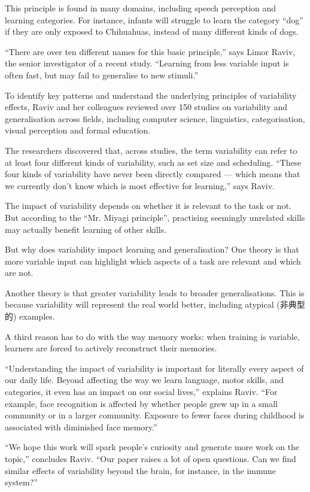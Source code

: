 \documentclass[UTF8,11pt]{ctexart}
\begin{document}
This principle is found in many domains, including speech perception and learning categories. For instance, infants will struggle to learn the category “dog” if they are only exposed to Chihuahuas, instead of many different kinds of dogs.


“There are over ten different names for this basic principle,” says Limor Raviv, the senior investigator of a recent study. “Learning from less variable input is often fast, but may fail to generalise to new stimuli.”


To identify key patterns and understand the underlying principles of variability effects, Raviv and her colleagues reviewed over 150 studies on variability and generalisation across fields, including computer science, linguistics, categorisation, visual perception and formal education.


The researchers discovered that, across studies, the term variability can refer to at least four different kinds of variability, such as set size and scheduling. “These four kinds of variability have never been directly compared — which means that we currently don’t know which is most effective for learning,” says Raviv.


The impact of variability depends on whether it is relevant to the task or not. But according to the “Mr. Miyagi principle”, practising seemingly unrelated skills may actually benefit learning of other skills.


But why does variability impact learning and generalisation? One theory is that more variable input can highlight which aspects of a task are relevant and which are not.


Another theory is that greater variability leads to broader generalisations. This is because variability will represent the real world better, including atypical (非典型的) examples.


A third reason has to do with the way memory works: when training is variable, learners are forced to actively reconstruct their memories.


“Understanding the impact of variability is important for literally every aspect of our daily life. Beyond affecting the way we learn language, motor skills, and categories, it even has an impact on our social lives,” explains Raviv. “For example, face recognition is affected by whether people grew up in a small community or in a larger community. Exposure to fewer faces during childhood is associated with diminished face memory.”


“We hope this work will spark people’s curiosity and generate more work on the topic,” concludes Raviv. “Our paper raises a lot of open questions. Can we find similar effects of variability beyond the brain, for instance, in the immune system?”
\end{document}
